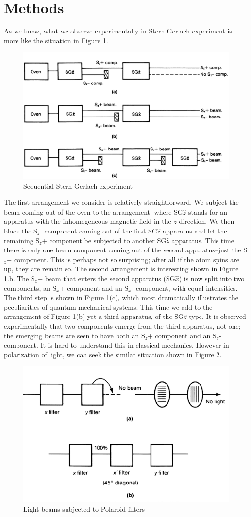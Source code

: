 \documentclass[a4paper]{article}
\begin{document}
\section{Methods}
As we know, what we observe experimentally in Stern-Gerlach experiment is more like the situation in Figure 1. 
\begin{figure}[htbp!] \label{experiment}
\centering %
    \includegraphics[width=0.5\linewidth]{SGexperiment.jpg}
    \caption{Sequential Stern-Gerlach experiment}
\end{figure}
\cite{Stern1922}The first arrangement we consider is relatively straightforward. We subject the beam coming out of the oven to the arrangement, where SG$\hat{z}$ stands for an apparatus with the inhomogeneous magnetic field in the $z$-direction. We then block the S$_z$- component coming out of the first SG$\hat{z}$ apparatus and let the remaining S$_z$+ component be subjected to another SG$\hat{z}$ apparatus. This time there is only one beam component coming out of the second apparatus--just the S$_z$+ component. This is perhaps not so surprising; after all if the atom spins are up, they are remain so. The second arrangement is interesting shown in Figure 1.b. The S$_z$+ beam that enters the second apparatus (SG$\hat{x}$) is now split into two components, an S$_x$+ component and an S$_x$- component, with equal intensities. The third step is shown in Figure 1(c), which most dramatically illustrates the peculiarities of quantum-mechanical systems. This time we add to the arrangement of Figure 1(b) yet a third apparatus,  of the SG$\hat{z}$ type. It is observed experimentally that two components emerge from the third apparatus, not one; the emerging beams are seen to have both an S$_z$+ component and an S$_z$- component. It is hard to understand this in classical mechanics. However in polarization of light, we can seek the similar  situation shown in Figure 2. 
\begin{figure}[htbp!] \label{polarization}
\centering %
    \includegraphics[width=0.5\linewidth]{polarization.jpg}
    \caption{Light beams subjected to Polaroid filters}
\end{figure}
\end{document}
